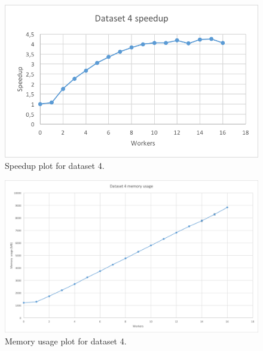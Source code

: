 \begin{figure}[ht]
  \centering
  \includegraphics[width=120mm]{figures/dataset_4/dataset_4_speedup.png}
  \caption[Speedup plot for dataset 4.]{Speedup plot for dataset 4.}
  \label{fig:dataset_4_speedup}
\end{figure}

\begin{figure}[ht]
  \centering
  \includegraphics[width=120mm]{figures/dataset_4/dataset_4_memory.png}
  \caption[Memory usage plot for dataset 4.]{Memory usage plot for dataset 4.}
  \label{fig:dataset_4_memory}
\end{figure}

